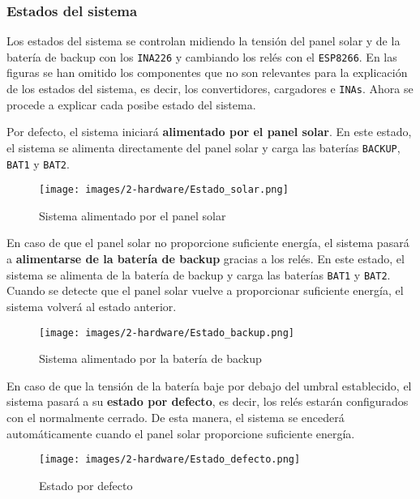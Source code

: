\subsubsection{Estados del sistema}\label{subsubsec:estados}

Los estados del sistema se controlan midiendo la tensión del panel solar y de la batería de backup con los \texttt{INA226} y cambiando los relés con el \texttt{ESP8266}. En las figuras se han omitido los componentes que no son relevantes para la explicación de los estados del sistema, es decir, los convertidores, cargadores e \texttt{INAs}. Ahora se procede a explicar cada posibe estado del sistema.

Por defecto, el sistema iniciará \textbf{alimentado por el panel solar}. En este estado, el sistema se alimenta directamente del panel solar y carga las baterías \texttt{BACKUP}, \texttt{BAT1} y \texttt{BAT2}.

\begin{figure}[H]
    \centering
    \texttt{[image: images/2-hardware/Estado\_solar.png]}
    \caption{Sistema alimentado por el panel solar}
    \label{fig:hardware/estados/solar}
\end{figure}

En caso de que el panel solar no proporcione suficiente energía, el sistema pasará a \textbf{alimentarse de la batería de backup} gracias a los relés. En este estado, el sistema se alimenta de la batería de backup y carga las baterías \texttt{BAT1} y \texttt{BAT2}. Cuando se detecte que el panel solar vuelve a proporcionar suficiente energía, el sistema volverá al estado anterior.

\begin{figure}[H]
    \centering
    \texttt{[image: images/2-hardware/Estado\_backup.png]}
    \caption{Sistema alimentado por la batería de backup}
    \label{fig:hardware/estados/backup}
\end{figure}

En caso de que la tensión de la batería baje por debajo del umbral establecido, el sistema pasará a su \textbf{estado por defecto}, es decir, los relés estarán configurados con el normalmente cerrado. De esta manera, el sistema se encederá automáticamente cuando el panel solar proporcione suficiente energía.

\begin{figure}[H]
    \centering
    \texttt{[image: images/2-hardware/Estado\_defecto.png]}
    \caption{Estado por defecto}
    \label{fig:hardware/estados/defecto}
\end{figure}
